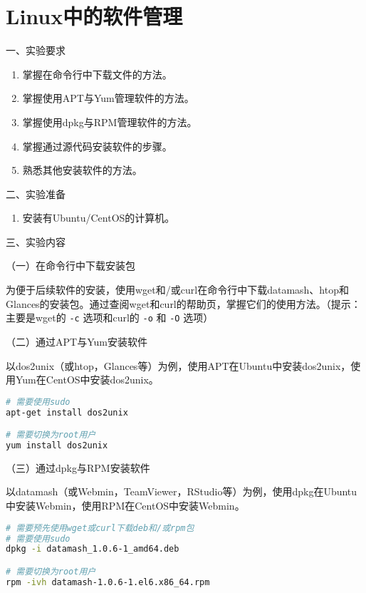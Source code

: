 \chapter{Linux中的软件管理}

\noindent
一、实验要求
\begin{enumerate}
  \item 掌握在命令行中下载文件的方法。
  \item 掌握使用APT与Yum管理软件的方法。
  \item 掌握使用dpkg与RPM管理软件的方法。
  \item 掌握通过源代码安装软件的步骤。
  \item 熟悉其他安装软件的方法。
\end{enumerate}

\vspace{0.2in}
\noindent
二、实验准备
\begin{enumerate}
  \item 安装有Ubuntu/CentOS的计算机。
\end{enumerate}

\vspace{0.2in}
\noindent
三、实验内容

\vspace{0.1in}
（一）在命令行中下载安装包

为便于后续软件的安装，使用wget和/或curl在命令行中下载datamash、htop和Glances的安装包。通过查阅wget和curl的帮助页，掌握它们的使用方法。（提示：主要是wget的 \verb|-c| 选项和curl的 \verb|-o| 和 \verb|-O| 选项）

\vspace{0.1in}
（二）通过APT与Yum安装软件

以dos2unix（或htop，Glances等）为例，使用APT在Ubuntu中安装dos2unix，使用Yum在CentOS中安装dos2unix。
\begin{lstlisting}[language=bash]
# 需要使用sudo
apt-get install dos2unix

# 需要切换为root用户
yum install dos2unix
\end{lstlisting}

\vspace{0.1in}
（三）通过dpkg与RPM安装软件

以datamash（或Webmin，TeamViewer，RStudio等）为例，使用dpkg在Ubuntu中安装Webmin，使用RPM在CentOS中安装Webmin。
\begin{lstlisting}[language=bash]
# 需要预先使用wget或curl下载deb和/或rpm包
# 需要使用sudo
dpkg -i datamash_1.0.6-1_amd64.deb

# 需要切换为root用户
rpm -ivh datamash-1.0.6-1.el6.x86_64.rpm
\end{lstlisting}

